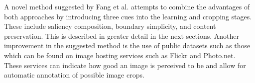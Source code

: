 A novel method suggested by Fang et al. \cite{fang2014automatic} attempts to
combine the advantages of both approaches by introducing three cues into the
learning and cropping stages.
These include saliency composition, boundary simplicity, and content
preservation.
This is described in greater detail in the next sections.
Another improvement in the suggested method is the use of public datasets such
as those which can be found on image hosting services such as Flickr and
Photo.net.
These services can indicate how good an image is perceived to be and allow for
automatic annotation of possible image crops.

